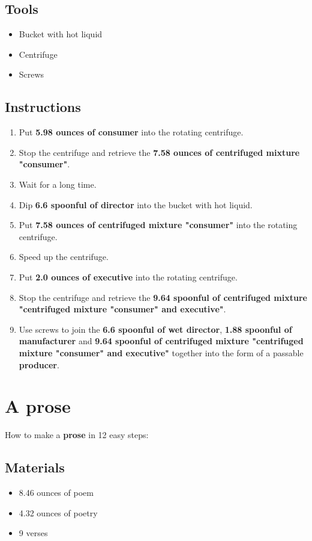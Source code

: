 \documentclass{article}
\begin{document}
\subsection{Tools}\begin{itemize}
\item 
Bucket with hot liquid
\item 
Centrifuge
\item 
Screws
\end{itemize}
\subsection{Instructions}\begin{enumerate}
\item 
Put \textbf{5.98 ounces of consumer} into the rotating centrifuge.
\item 
Stop the centrifuge and retrieve the \textbf{7.58 ounces of centrifuged mixture "consumer"}.
\item 
Wait for a long time.
\item 
Dip \textbf{6.6 spoonful of director} into the bucket with hot liquid.
\item 
Put \textbf{7.58 ounces of centrifuged mixture "consumer"} into the rotating centrifuge.
\item 
Speed up the centrifuge.
\item 
Put \textbf{2.0 ounces of executive} into the rotating centrifuge.
\item 
Stop the centrifuge and retrieve the \textbf{9.64 spoonful of centrifuged mixture "centrifuged mixture "consumer" and executive"}.
\item 
Use screws to join the \textbf{6.6 spoonful of wet director}, \textbf{1.88 spoonful of manufacturer} and \textbf{9.64 spoonful of centrifuged mixture "centrifuged mixture "consumer" and executive"} together into the form of a passable \textbf{producer}.
\end{enumerate}
\newpage
\section{A prose}How to make a \textbf{prose} in 12 easy steps:

\subsection{Materials}\begin{itemize}
\item 
8.46 ounces of poem
\item 
4.32 ounces of poetry
\item 
9 verses
\end{itemize}
\end{document}
